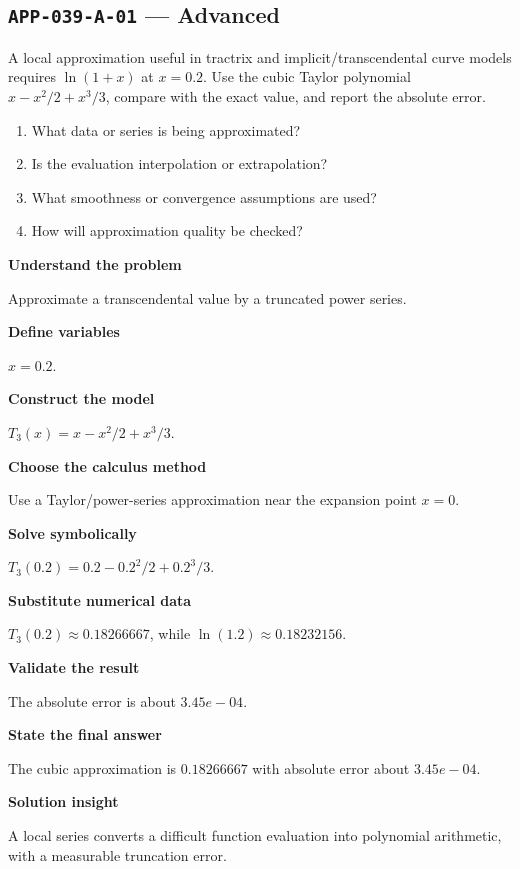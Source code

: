 \documentclass[11pt]{book}
\newcommand{\pid}[1]{\texttt{#1}}
\begin{document}
\subsection*{\pid{APP-039-A-01} — Advanced}
\begin{problembox}
A local approximation useful in tractrix and implicit/transcendental curve models requires $\ln(1+x)$ at $x=0.2$. Use the cubic Taylor polynomial $x-x^2/2+x^3/3$, compare with the exact value, and report the absolute error.
\end{problembox}
\begin{promptbox}\begin{enumerate}
\item What data or series is being approximated?
\item Is the evaluation interpolation or extrapolation?
\item What smoothness or convergence assumptions are used?
\item How will approximation quality be checked?
\end{enumerate}\end{promptbox}
\begin{solutionbox}
\textbf{Understand the problem}\par Approximate a transcendental value by a truncated power series.\par\medskip
\textbf{Define variables}\par $x=0.2$.\par\medskip
\textbf{Construct the model}\par $T_3(x)=x-x^2/2+x^3/3$.\par\medskip
\textbf{Choose the calculus method}\par Use a Taylor/power-series approximation near the expansion point $x=0$.\par\medskip
\textbf{Solve symbolically}\par $T_3(0.2)=0.2-0.2^2/2+0.2^3/3$.\par\medskip
\textbf{Substitute numerical data}\par $T_3(0.2)\approx 0.18266667$, while $\ln(1.2)\approx 0.18232156$.\par\medskip
\textbf{Validate the result}\par The absolute error is about $3.45e-04$.\par\medskip
\textbf{State the final answer}\par The cubic approximation is $0.18266667$ with absolute error about $3.45e-04$.\par\medskip
\textbf{Solution insight}\par A local series converts a difficult function evaluation into polynomial arithmetic, with a measurable truncation error.\par\medskip
\end{solutionbox}
\end{document}
